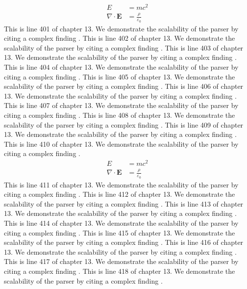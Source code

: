 \begin{align*}
  E &= mc^2 \\
  \nabla \cdot \mathbf{E} &= \frac{\rho}{\varepsilon_0}
\end{align*}
This is line 401 of chapter 13. We demonstrate the scalability of the parser by citing a complex finding \cite{ref13_401}.
This is line 402 of chapter 13. We demonstrate the scalability of the parser by citing a complex finding \cite{ref13_402}.
This is line 403 of chapter 13. We demonstrate the scalability of the parser by citing a complex finding \cite{ref13_403}.
This is line 404 of chapter 13. We demonstrate the scalability of the parser by citing a complex finding \cite{ref13_404}.
This is line 405 of chapter 13. We demonstrate the scalability of the parser by citing a complex finding \cite{ref13_405}.
This is line 406 of chapter 13. We demonstrate the scalability of the parser by citing a complex finding \cite{ref13_406}.
This is line 407 of chapter 13. We demonstrate the scalability of the parser by citing a complex finding \cite{ref13_407}.
This is line 408 of chapter 13. We demonstrate the scalability of the parser by citing a complex finding \cite{ref13_408}.
This is line 409 of chapter 13. We demonstrate the scalability of the parser by citing a complex finding \cite{ref13_409}.
This is line 410 of chapter 13. We demonstrate the scalability of the parser by citing a complex finding \cite{ref13_410}.
\begin{align*}
  E &= mc^2 \\
  \nabla \cdot \mathbf{E} &= \frac{\rho}{\varepsilon_0}
\end{align*}
This is line 411 of chapter 13. We demonstrate the scalability of the parser by citing a complex finding \cite{ref13_411}.
This is line 412 of chapter 13. We demonstrate the scalability of the parser by citing a complex finding \cite{ref13_412}.
This is line 413 of chapter 13. We demonstrate the scalability of the parser by citing a complex finding \cite{ref13_413}.
This is line 414 of chapter 13. We demonstrate the scalability of the parser by citing a complex finding \cite{ref13_414}.
This is line 415 of chapter 13. We demonstrate the scalability of the parser by citing a complex finding \cite{ref13_415}.
This is line 416 of chapter 13. We demonstrate the scalability of the parser by citing a complex finding \cite{ref13_416}.
This is line 417 of chapter 13. We demonstrate the scalability of the parser by citing a complex finding \cite{ref13_417}.
This is line 418 of chapter 13. We demonstrate the scalability of the parser by citing a complex finding \cite{ref13_418}.
